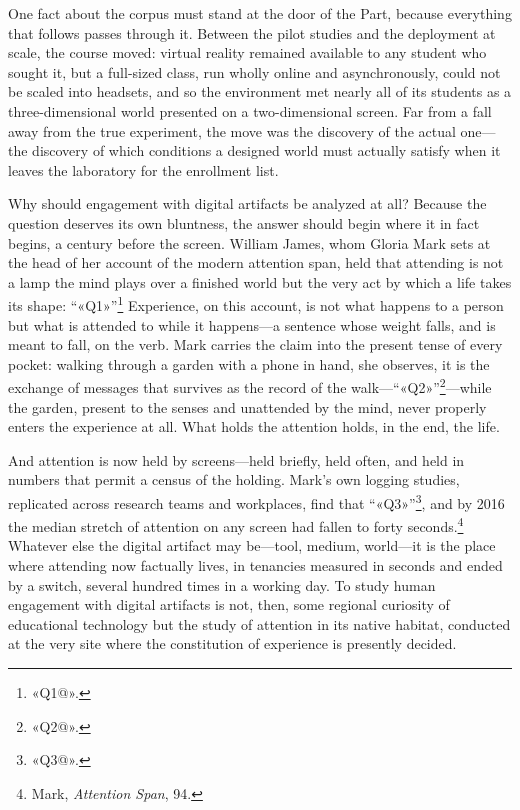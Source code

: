 One fact about the corpus must stand at the door of the Part, because everything that follows passes through it. Between the pilot studies and the deployment at scale, the course moved: virtual reality remained available to any student who sought it, but a full-sized class, run wholly online and asynchronously, could not be scaled into headsets, and so the environment met nearly all of its students as a three-dimensional world presented on a two-dimensional screen. Far from a fall away from the true experiment, the move was the discovery of the actual one---the discovery of which conditions a designed world must actually satisfy when it leaves the laboratory for the enrollment list.

Why should engagement with digital artifacts be analyzed at all? Because the question deserves its own bluntness, the answer should begin where it in fact begins, a century before the screen. William James, whom Gloria Mark sets at the head of her account of the modern attention span, held that attending is not a lamp the mind plays over a finished world but the very act by which a life takes its shape: ``«Q1»''\footnote{«Q1@».} Experience, on this account, is not what happens to a person but what is attended to while it happens---a sentence whose weight falls, and is meant to fall, on the verb. Mark carries the claim into the present tense of every pocket: walking through a garden with a phone in hand, she observes, it is the exchange of messages that survives as the record of the walk---``«Q2»''\footnote{«Q2@».}---while the garden, present to the senses and unattended by the mind, never properly enters the experience at all. What holds the attention holds, in the end, the life.

And attention is now held by screens---held briefly, held often, and held in numbers that permit a census of the holding. Mark's own logging studies, replicated across research teams and workplaces, find that ``«Q3»''\footnote{«Q3@».}, and by 2016 the median stretch of attention on any screen had fallen to forty seconds.\footnote{Mark, \textit{Attention Span}, 94.} Whatever else the digital artifact may be---tool, medium, world---it is the place where attending now factually lives, in tenancies measured in seconds and ended by a switch, several hundred times in a working day. To study human engagement with digital artifacts is not, then, some regional curiosity of educational technology but the study of attention in its native habitat, conducted at the very site where the constitution of experience is presently decided.

